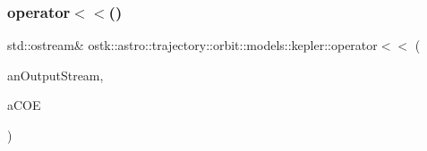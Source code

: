 \subsubsection{\texorpdfstring{operator$<$$<$()}{operator<<()}}
{\footnotesize\ttfamily std\+::ostream\& ostk\+::astro\+::trajectory\+::orbit\+::models\+::kepler\+::operator$<$$<$ (\begin{DoxyParamCaption}\item[{std\+::ostream \&}]{an\+Output\+Stream,  }\item[{const \hyperlink{classostk_1_1astro_1_1trajectory_1_1orbit_1_1models_1_1kepler_1_1_c_o_e}{C\+OE} \&}]{a\+C\+OE }\end{DoxyParamCaption})}

